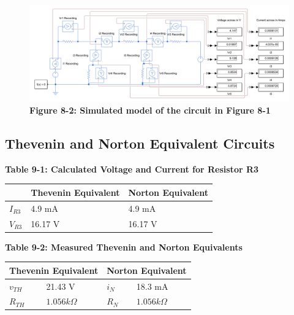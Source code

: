 \documentclass[a4paper]{article}
\begin{document}
\begin{center}
    \begin{figure}[H]\label{fig8-2}
        \begin{center}
            \includegraphics[width = 16 cm]{Figure_8-1}\\
            \small\textbf{Figure 8-2: Simulated model of the circuit in Figure 8-1}\\    
        \end{center}
    \end{figure}
\end{center}


\subsection{Thevenin and Norton Equivalent Circuits}


\begin{center}
    \small\textbf{Table 9-1: Calculated Voltage and Current for Resistor R3}
    \begin{tabular}{|p{3 cm}|p{3cm}|p{3 cm}|}
        \hline
         & Thevenin Equivalent & Norton Equivalent\\
        \hline
        $I_{R3}$ & 4.9 mA & 4.9 mA  \\
        \hline
        $V_{R3}$ & 16.17 V & 16.17 V  \\
        \hline
        
    \end{tabular}
\end{center}

\begin{center}
    \small\textbf{Table 9-2: Measured Thevenin and Norton Equivalents}
    \begin{tabular}{|p{3 cm}|p{3cm}|p{3 cm}|p{3 cm}|}      
        \hline
        \multicolumn{2}{|c|}{Thevenin Equivalent} & \multicolumn{2}{|c|}{Norton Equivalent}  \\
        \hline
        $v_{TH}$ & 21.43 V & $i_{N}$ & 18.3 mA \\
        \hline
        $R_{TH}$ & $1.056k\Omega$ & $R_{N}$ & $1.056k\Omega$ \\
        \hline
    \end{tabular}
\end{center}
\end{document}
